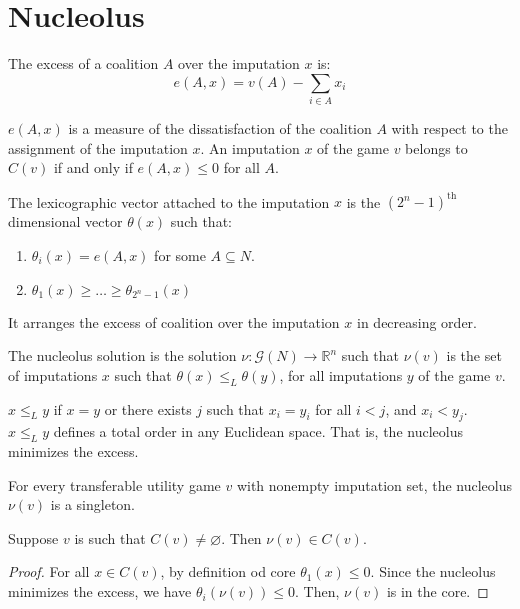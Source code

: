 \section{Nucleolus}

\begin{definition}
    The excess of a coalition $A$ over the imputation $x$ is: 
    \[e(A,x)=v(A)-\sum_{i\in A}x_i\]
\end{definition}
\noindent $e(A,x)$ is a measure of the dissatisfaction of the coalition $A$ with respect to the assignment of the imputation $x$. 
An imputation $x$ of the game $v$ belongs to $C(v)$ if and only if $e(A,x)\leq 0$ for all $A$. 

\begin{definition}
    The lexicographic vector attached to the imputation $x$ is the $(2^{n}-1)^{\text{th}}$ dimensional vector $\theta(x)$ such that: 
    \begin{enumerate}
        \item $\theta_i(x)=e(A,x)$ for some $A\subseteq N$.
        \item $\theta_1(x)\geq \dots \geq \theta_{2^n-1}(x)$
    \end{enumerate}
\end{definition}
\noindent It arranges the excess of coalition over the imputation $x$ in decreasing order. 
\begin{definition}
    The nucleolus solution is the solution $\nu:\mathcal{G}(N)\rightarrow\mathbb{R}^n$ such that $\nu(v)$ is the set of imputations $x$ such that $\theta(x)\leq_L\theta(y)$, for all imputations $y$ of the game $v$. 
\end{definition}
\noindent $x\leq_Ly$ if $x=y$ or there exists $j$ such that $x_i=y_i$ for all $i<j$, and $x_i<y_j$. 
$x\leq_Ly$ defines a total order in any Euclidean space. 
That is, the nucleolus minimizes the excess. 
\begin{theorem}
    For every transferable utility game $v$ with nonempty imputation set, the nucleolus $\nu(v)$ is a singleton.
\end{theorem}
\begin{proposition}
    Suppose $v$ is such that $C(v)\neq\varnothing$. 
    Then $\nu(v)\in C(v)$.
\end{proposition}
\begin{proof}
    For all $x\in C(v)$, by definition od core $\theta_1(x)\leq 0$. 
    Since the nucleolus minimizes the excess, we have $\theta_i(\nu(v))\leq 0$. 
    Then, $\nu(v)$ is in the core. 
\end{proof}